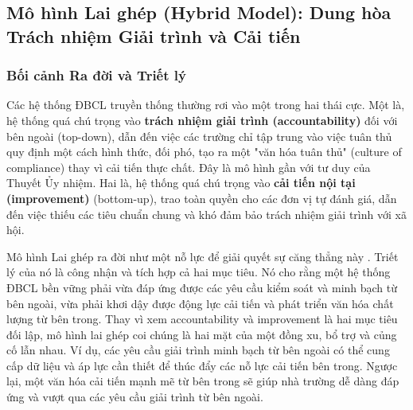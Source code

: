 \documentclass[12pt, a4paper, openany]{report}
\begin{document}
\subsection{Mô hình Lai ghép (Hybrid Model): Dung hòa Trách nhiệm Giải trình và Cải tiến}

\subsubsection{Bối cảnh Ra đời và Triết lý}
Các hệ thống ĐBCL truyền thống thường rơi vào một trong hai thái cực. Một là, hệ thống quá chú trọng vào \textbf{trách nhiệm giải trình (accountability)} đối với bên ngoài (top-down), dẫn đến việc các trường chỉ tập trung vào việc tuân thủ quy định một cách hình thức, đối phó, tạo ra một "văn hóa tuân thủ" (culture of compliance) thay vì cải tiến thực chất. Đây là mô hình gần với tư duy của Thuyết Ủy nhiệm. Hai là, hệ thống quá chú trọng vào \textbf{cải tiến nội tại (improvement)} (bottom-up), trao toàn quyền cho các đơn vị tự đánh giá, dẫn đến việc thiếu các tiêu chuẩn chung và khó đảm bảo trách nhiệm giải trình với xã hội.

Mô hình Lai ghép ra đời như một nỗ lực để giải quyết sự căng thẳng này \cite{EUA_Integration}. Triết lý của nó là công nhận và tích hợp cả hai mục tiêu. Nó cho rằng một hệ thống ĐBCL bền vững phải vừa đáp ứng được các yêu cầu kiểm soát và minh bạch từ bên ngoài, vừa phải khơi dậy được động lực cải tiến và phát triển văn hóa chất lượng từ bên trong. Thay vì xem accountability và improvement là hai mục tiêu đối lập, mô hình lai ghép coi chúng là hai mặt của một đồng xu, bổ trợ và củng cố lẫn nhau. Ví dụ, các yêu cầu giải trình minh bạch từ bên ngoài có thể cung cấp dữ liệu và áp lực cần thiết để thúc đẩy các nỗ lực cải tiến bên trong. Ngược lại, một văn hóa cải tiến mạnh mẽ từ bên trong sẽ giúp nhà trường dễ dàng đáp ứng và vượt qua các yêu cầu giải trình từ bên ngoài.
\end{document}
